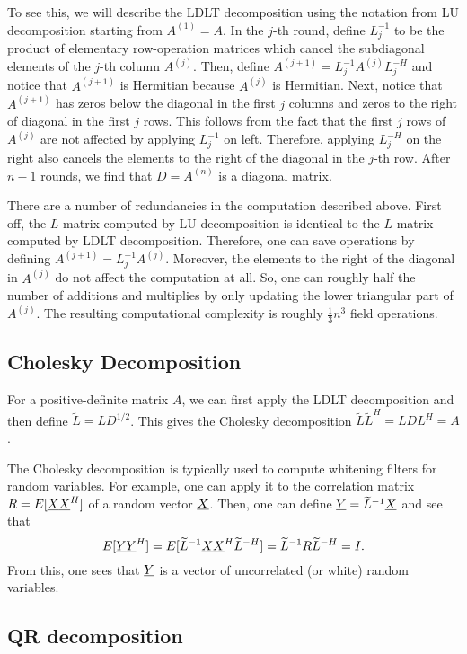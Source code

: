 To see this, we will describe the LDLT decomposition using the notation from LU decomposition starting from $A^{(1)} = A$.
In the $j$-th round, define $L_j^{-1}$ to be the product of elementary row-operation matrices which cancel the subdiagonal elements of the $j$-th column $A^{(j)}$.
Then, define $A^{(j+1)} = L_j^{-1} A^{(j)} L_j^{-H}$ and notice that $A^{(j+1)}$ is Hermitian because $A^{(j)}$ is Hermitian.
Next, notice that $A^{(j+1)}$ has zeros below the diagonal in the first $j$ columns and zeros to the right of diagonal in the first $j$ rows.
This follows from the fact that the first $j$ rows of $A^{(j)}$ are not affected by applying $L_j^{-1}$ on left.
Therefore, applying $L_j^{-H}$ on the right also cancels the elements to the right of the diagonal in the $j$-th row.
After $n-1$ rounds, we find that $D = A^{(n)}$ is a diagonal matrix.

There are a number of redundancies in the computation described above.
First off, the $L$ matrix computed by LU decomposition is identical to the $L$ matrix computed by LDLT decomposition.
Therefore, one can save operations by defining $A^{(j+1)} = L_j^{-1} A^{(j)}$.
Moreover, the elements to the right of the diagonal in $A^{(j)}$ do not affect the computation at all.
So, one can roughly half the number of additions and multiplies by only updating the lower triangular part of $A^{(j)}$.
The resulting computational complexity is roughly $\frac{1}{3}n^3$ field operations.

\subsection{Cholesky Decomposition}

For a positive-definite matrix $A$, we can first apply the LDLT decomposition and then define $\widetilde{L} = L D^{1/2}$.
This gives the Cholesky decomposition $\widetilde{L} \widetilde{L}^H = L D L^H = A$.

The Cholesky decomposition is typically used to compute whitening filters for random variables.
For example, one can apply it to the correlation matrix $R = E [ \underline{X} \underline{X}^H ]$ of a random vector $\underline{X}$.
Then, one can define $\underline{Y} = \widetilde{L}^{-1} \underline{X}$ and see that
\[ E [ \underline{Y} \underline{Y}^H ] =  E [ \widetilde{L}^{-1} \underline{X} \underline{X}^H \widetilde{L}^{-H}] = \widetilde{L}^{-1} R \widetilde{L}^{-H} = I. \]
From this, one sees that $\underline{Y}$ is a vector of uncorrelated (or white) random variables.

\subsection{QR decomposition}


